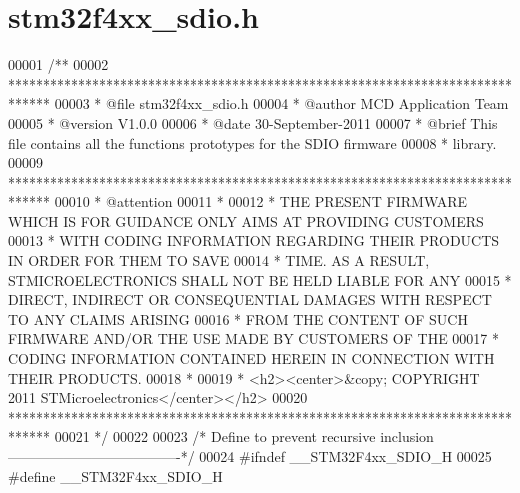 \section{stm32f4xx\+\_\+sdio.\+h}
\label{stm32f4xx__sdio_8h_source}

\begin{DoxyCode}
00001 \textcolor{comment}{/**}
00002 \textcolor{comment}{  ******************************************************************************}
00003 \textcolor{comment}{  * @file    stm32f4xx\_sdio.h}
00004 \textcolor{comment}{  * @author  MCD Application Team}
00005 \textcolor{comment}{  * @version V1.0.0}
00006 \textcolor{comment}{  * @date    30-September-2011}
00007 \textcolor{comment}{  * @brief   This file contains all the functions prototypes for the SDIO firmware}
00008 \textcolor{comment}{  *          library.}
00009 \textcolor{comment}{  ******************************************************************************}
00010 \textcolor{comment}{  * @attention}
00011 \textcolor{comment}{  *}
00012 \textcolor{comment}{  * THE PRESENT FIRMWARE WHICH IS FOR GUIDANCE ONLY AIMS AT PROVIDING CUSTOMERS}
00013 \textcolor{comment}{  * WITH CODING INFORMATION REGARDING THEIR PRODUCTS IN ORDER FOR THEM TO SAVE}
00014 \textcolor{comment}{  * TIME. AS A RESULT, STMICROELECTRONICS SHALL NOT BE HELD LIABLE FOR ANY}
00015 \textcolor{comment}{  * DIRECT, INDIRECT OR CONSEQUENTIAL DAMAGES WITH RESPECT TO ANY CLAIMS ARISING}
00016 \textcolor{comment}{  * FROM THE CONTENT OF SUCH FIRMWARE AND/OR THE USE MADE BY CUSTOMERS OF THE}
00017 \textcolor{comment}{  * CODING INFORMATION CONTAINED HEREIN IN CONNECTION WITH THEIR PRODUCTS.}
00018 \textcolor{comment}{  *}
00019 \textcolor{comment}{  * <h2><center>&copy; COPYRIGHT 2011 STMicroelectronics</center></h2>}
00020 \textcolor{comment}{  ******************************************************************************}
00021 \textcolor{comment}{  */}
00022 
00023 \textcolor{comment}{/* Define to prevent recursive inclusion -------------------------------------*/}
00024 \textcolor{preprocessor}{#}\textcolor{preprocessor}{ifndef} \textcolor{preprocessor}{\_\_STM32F4xx\_SDIO\_H}
00025 \textcolor{preprocessor}{#}\textcolor{preprocessor}{define} \textcolor{preprocessor}{\_\_STM32F4xx\_SDIO\_H}

\end{DoxyCode}

